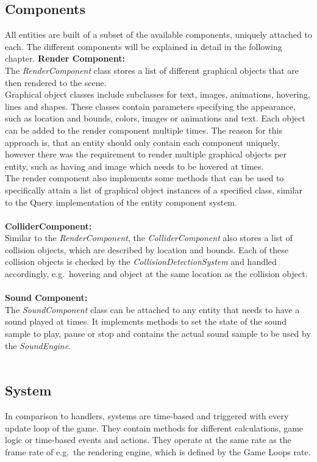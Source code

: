 \subsection{Components}\label{subsec:components}
All entities are built of a subset of the available components, uniquely attached to each.
The different components will be explained in detail in the following chapter.
\textbf{Render Component:} \\
The \textit{RenderComponent} class stores a list of different graphical objects that are then rendered to the scene.\\
Graphical object classes include subclasses for text, images, animations, hovering, lines and shapes.
These classes contain parameters specifying the appearance, such as location and bounds, colors, images or animations and text.
Each object can be added to the render component multiple times.
The reason for this approach is, that an entity should only contain each component uniquely, however there was the requirement to render multiple graphical
objects per entity, such as having and image which needs to be hovered at times. \\
The render component also implements some methods that can be used to specifically attain a list of graphical object instances of a specified class, similar to the Query
implementation of the entity component system.\\ \\

\textbf{ColliderComponent:} \\
Similar to the \textit{RenderComponent}, the \textit{ColliderComponent} also stores a list of collision objects, which are described by location and bounds.
Each of these collision objects is checked by the \textit{CollisionDetectionSystem} and handled accordingly, e.g.\
hovering and object at the same location as the collision object. \\ \\

\textbf{Sound Component:} \\
The \textit{SoundComponent} class can be attached to any entity that needs to have a sound played at times.
It implements methods to set the state of the sound sample to play, pause or stop and contains the actual sound sample to be used by the \textit{SoundEngine}. \\ \\

\subsection{System}\label{subsec:system}
In comparison to handlers, systems are time-based and triggered with every update loop of the game.
They contain methods for different calculations, game logic or time-based events and actions.
They operate at the same rate as the frame rate of e.g.\ the rendering engine, which is defined by the Game Loops rate.


